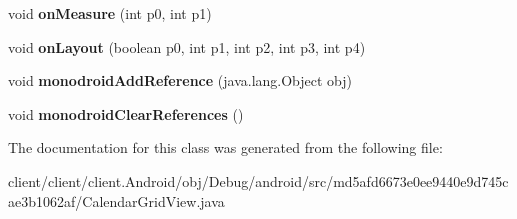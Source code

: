 \begin{DoxyCompactItemize}
\item 
\hypertarget{classmd5afd6673e0ee9440e9d745cae3b1062af_1_1CalendarGridView_a1ac288c898f47b095a02be425c7fc015}{}void {\bfseries on\+Measure} (int p0, int p1)\label{classmd5afd6673e0ee9440e9d745cae3b1062af_1_1CalendarGridView_a1ac288c898f47b095a02be425c7fc015}

\item 
\hypertarget{classmd5afd6673e0ee9440e9d745cae3b1062af_1_1CalendarGridView_aa45eb4fcb6d3f73da7c4da5fc2682731}{}void {\bfseries on\+Layout} (boolean p0, int p1, int p2, int p3, int p4)\label{classmd5afd6673e0ee9440e9d745cae3b1062af_1_1CalendarGridView_aa45eb4fcb6d3f73da7c4da5fc2682731}

\item 
\hypertarget{classmd5afd6673e0ee9440e9d745cae3b1062af_1_1CalendarGridView_a22bfa77ff45ccc7f1ae5c9ea1e1aa498}{}void {\bfseries monodroid\+Add\+Reference} (java.\+lang.\+Object obj)\label{classmd5afd6673e0ee9440e9d745cae3b1062af_1_1CalendarGridView_a22bfa77ff45ccc7f1ae5c9ea1e1aa498}

\item 
\hypertarget{classmd5afd6673e0ee9440e9d745cae3b1062af_1_1CalendarGridView_a5740477f4b15768d1e0cb0c88f165bea}{}void {\bfseries monodroid\+Clear\+References} ()\label{classmd5afd6673e0ee9440e9d745cae3b1062af_1_1CalendarGridView_a5740477f4b15768d1e0cb0c88f165bea}

\end{DoxyCompactItemize}


The documentation for this class was generated from the following file\+:\begin{DoxyCompactItemize}
\item 
client/client/client.\+Android/obj/\+Debug/android/src/md5afd6673e0ee9440e9d745cae3b1062af/Calendar\+Grid\+View.\+java\end{DoxyCompactItemize}
